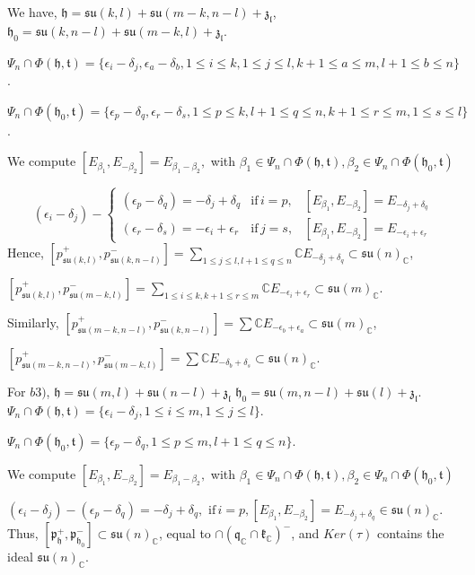 \documentclass[12pt]{amsart}
\theoremstyle{definition}
\theoremstyle{remark}
\newcommand{\h}{\mathfrak{h}}
\renewcommand{\k}{{\mathfrak k}}
\renewcommand{\l}{\mathfrak l}
\newcommand{\p}{\mathfrak p}
\newcommand{\q}{\mathfrak q}
\newcommand{\z}{\mathfrak z}
\renewcommand{\t}{{\mathfrak t}}
\newcommand{\C}{{\mathbb C}}
\numberwithin{equation}{section}
\begin{document}
  We have, $\h=\mathfrak{su}(k,l)+  \mathfrak{su}(m-k,n-l)+\z_\l$, $\h_0= \mathfrak{su}(k,n-l)+  \mathfrak{su}(m-k,l) +\z_\l$.

  $\Psi_n \cap \Phi(\h,\t)=\{ \epsilon_i -\delta_j, \epsilon_a -\delta_b, 1\leq i\leq k, 1\leq j \leq l, k+1 \leq a \leq m, l+1 \leq b \leq n \}$.


  $\Psi_n \cap \Phi(\h_0,\t)=\{ \epsilon_p -\delta_q, \epsilon_r -\delta_s, 1\leq p\leq k,   l+1 \leq q \leq n , k+1 \leq r \leq m,  1 \leq s \leq l \}$.

 We compute $[E_{\beta_1} ,E_{-\beta_2}]=E_{\beta_1 -\beta_2},$ with $\beta_1 \in \Psi_n \cap \Phi(\h,\t), \beta_2 \in \Psi_n \cap \Phi(\h_0,\t)$

$$ (\epsilon_i -\delta_j)- \left\{ \begin{array}{lllll}
 ( \epsilon_p -\delta_q)= -\delta_j +\delta_q & \text{if}\, i=p, &      [E_{\beta_1} ,E_{-\beta_2}]=E_{-\delta_j +\delta_q} \\
 (\epsilon_r -\delta_s)=-\epsilon_i +\epsilon_r & \text{if}\, j=s, &    [E_{\beta_1} ,E_{-\beta_2}]= E_{-\epsilon_i +\epsilon_r}
\end{array}
\right. $$
Hence, $[p_{\mathfrak{su}(k,l)}^+,p_{{\mathfrak{su}(k,n-l)}}^-] =
\sum_{1\leq j\leq l, l+1\leq q \leq n} \C E_{-\delta_j +\delta_q} \subset  \mathfrak{su}(n)_\C  $,

$[p_{\mathfrak{su}(k,l)}^+,p_{{\mathfrak{su}(m-k,l)}}^-] =
\sum_{1\leq i\leq k, k+1\leq r \leq m} \C E_{-\epsilon_i +\epsilon_r} \subset
\mathfrak{su}(m)_\C $.

Similarly,  $[p_{\mathfrak{su}(m-k,n-l)}^+,p_{{\mathfrak{su}(k,n-l)}}^-] =\sum \C E_{-\epsilon_b +\epsilon_a} \subset  \mathfrak{su}(m)_\C  $,

$[p_{\mathfrak{su}(m-k,n-l)}^+,p_{{\mathfrak{su}(m-k,l)}}^-] =\sum \C E_{-\delta_b +\delta_s} \subset  \mathfrak{su}(n)_\C $.



\medskip
 For $b3)$, $\h=   \mathfrak{su}(m,l)+ \mathfrak{su}(n-l)+\z_\l$ $\h_0= \mathfrak{su}(m,n-l)+  \mathfrak{su}(l)+\z_\l$.   $\Psi_n \cap \Phi(\h,\t)=\{ \epsilon_i -\delta_j,  1\leq i\leq m, 1\leq j \leq l  \}$.


  $\Psi_n \cap \Phi(\h_0,\t)=\{ \epsilon_p -\delta_q,     1 \leq p \leq m , l+1 \leq q \leq n \}$.

 We compute $[E_{\beta_1} ,E_{-\beta_2}]=E_{\beta_1 -\beta_2},$ with $\beta_1 \in \Psi_n \cap \Phi(\h,\t), \beta_2 \in \Psi_n \cap \Phi(\h_0,\t)$

$ (\epsilon_i -\delta_j)-
( \epsilon_p -\delta_q)= -\delta_j +\delta_q, \,\, \text{if}\, i=p,
[E_{\beta_1} ,E_{-\beta_2}]=E_{-\delta_j +\delta_q}\in \mathfrak{su}(n)_\C  $.
Thus, $[\p_\h^+ , \p_{\h_0}^- ] \subset \mathfrak{su}(n)_\C $,  equal to $\cap (\q_\C \cap \k_\C)^-$,
and $Ker(\tau)$ contains
the ideal $\mathfrak{su}(n)_\C$.
\end{document}
